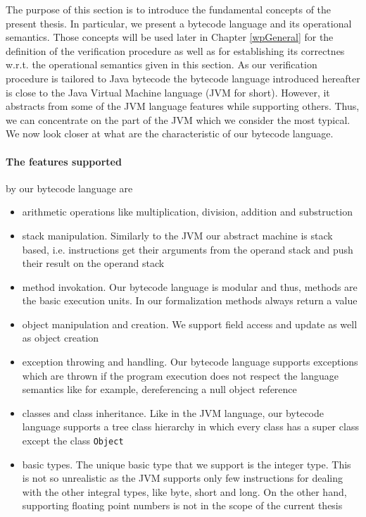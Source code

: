 
 The purpose of this section is to introduce the fundamental concepts of the
 present thesis. In particular, we present a bytecode language 
 and its operational semantics. Those concepts will be used later in Chapter \ref{wpGeneral}
 for the definition of the verification
 procedure as well as for establishing 
 its correctnes w.r.t. the operational semantics
 given in this section. As our verification procedure is tailored to Java bytecode 
 the bytecode language introduced hereafter is close to the Java Virtual Machine 
 language \cite{VMSpec}(JVM for short). However, it abstracts from some of the JVM language
 features while supporting others. Thus, we can concentrate on the part of the JVM which we consider
 the most typical. We now look closer at what are the characteristic of our bytecode language. 

\paragraph{The features supported}  by our bytecode language are 
\begin{itemize} 
   \item  arithmetic operations like multiplication, division, addition and substruction 
   \item  stack manipulation. Similarly to the JVM  our abstract machine is stack based, i.e. instructions
          get their arguments from the operand stack and push their result on the  operand stack
   \item  method invokation. Our bytecode language is modular and thus, methods are the basic execution units.
          In our formalization methods always return a value
   \item  object manipulation and creation. We support field access and update as well as object creation 
   \item  exception throwing and handling. Our bytecode language supports exceptions which are thrown if the program execution 
          does not respect the language semantics like for example, dereferencing a null object reference                 

   \item  classes and class inheritance. Like in the JVM language, our bytecode language supports  a tree class hierarchy in which every class 
          has a super class except the class \texttt{Object} 
   \item  basic types. The unique basic type that we support is the integer type. This is not so unrealistic as the JVM supports only few instructions
          for dealing with the other integral types, like byte, short and long. On the other hand, supporting floating point numbers is not in the scope
	  of the current thesis   
\end{itemize} 
 
